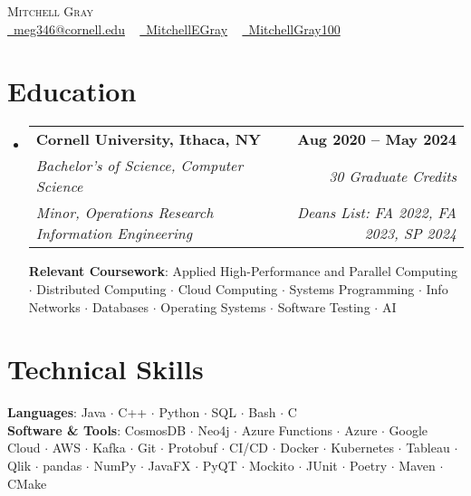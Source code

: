 \documentclass[letterpaper,11pt]{article}
\makeatletter
\newcommand{\resumeSpecialSubheading}[6]{
  \vspace{-2pt}\item
    \begin{tabular*}{1.0\textwidth}[t]{l@{\extracolsep{\fill}}r}
      \textbf{#1} & \textbf{\small #2} \\
      \textit{\small#3} & \textit{\small #4} \\
      \textit{\small#5} & \textit{\small #6} \\
    \end{tabular*}\vspace{-7pt}
}
\newcommand{\resumeSubHeadingListStart}{\begin{itemize}[leftmargin=0.0in, label={}]}
\newcommand{\resumeSubHeadingListEnd}{\end{itemize}}
\makeatother
\begin{document}
\begin{center}
    {\Huge \scshape Mitchell Gray} \\ \vspace{1pt}
    \small
    \href{mailto:youremail@gmail.com}{\faEnvelope\ meg346@cornell.edu} ~ 
    \href{https://www.linkedin.com/in/mitchellegray/}{\faLinkedin\ MitchellEGray}  ~
    \href{https://github.com/MitchellGray100}{\faGithub\ MitchellGray100}
    \vspace{-8pt}
\end{center}


\section{Education}
  \resumeSubHeadingListStart
    \resumeSpecialSubheading
      {Cornell University, Ithaca, NY}{Aug 2020 -- May 2024}
      {Bachelor's of Science, Computer Science}{30 Graduate Credits}%
      {Minor, Operations Research Information Engineering}{Deans List: FA 2022, FA 2023, SP 2024}

      \textbf{Relevant Coursework}: Applied High-Performance and Parallel Computing $\cdot$ Distributed Computing $\cdot$ Cloud 
      Computing $\cdot$ Systems Programming $\cdot$ Info Networks $\cdot$ Databases 
      $\cdot$ Operating Systems $\cdot$ Software Testing $\cdot$ AI 
               

  \resumeSubHeadingListEnd
\vspace{-18pt}

\section{Technical Skills}
 \begin{itemize}[leftmargin=0.1in, label={}]
    \small{\item{
     \textbf{Languages}{: Java $\cdot$ C++ $\cdot$ Python $\cdot$ SQL $\cdot$ Bash $\cdot$ C} \\
     \textbf{Software \& Tools}{: 
     CosmosDB $\cdot$ Neo4j $\cdot$ 
     Azure Functions $\cdot$ Azure $\cdot$ Google Cloud $\cdot$ AWS $\cdot$ Kafka $\cdot$
     Git $\cdot$ Protobuf $\cdot$ CI/CD $\cdot$ Docker $\cdot$ Kubernetes
     $\cdot$ Tableau $\cdot$ Qlik $\cdot$ pandas $\cdot$ NumPy $\cdot$
     JavaFX $\cdot$ PyQT $\cdot$ 
     Mockito $\cdot$ JUnit $\cdot$
     Poetry $\cdot$ Maven $\cdot$ CMake}\\
    }}
 \end{itemize}
 \vspace{-20pt}
\end{document}
